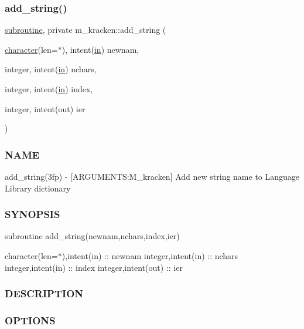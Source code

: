 \subsubsection{\texorpdfstring{add\+\_\+string()}{add\_string()}}
{\footnotesize\ttfamily \hyperlink{M__stopwatch_83_8txt_acfbcff50169d691ff02d4a123ed70482}{subroutine}, private m\+\_\+kracken\+::add\+\_\+string (\begin{DoxyParamCaption}\item[{\hyperlink{option__stopwatch_83_8txt_abd4b21fbbd175834027b5224bfe97e66}{character}(len=$\ast$), intent(\hyperlink{M__journal_83_8txt_afce72651d1eed785a2132bee863b2f38}{in})}]{newnam,  }\item[{integer, intent(\hyperlink{M__journal_83_8txt_afce72651d1eed785a2132bee863b2f38}{in})}]{nchars,  }\item[{integer, intent(\hyperlink{M__journal_83_8txt_afce72651d1eed785a2132bee863b2f38}{in})}]{index,  }\item[{integer, intent(out)}]{ier }\end{DoxyParamCaption})\hspace{0.3cm}{\ttfamily [private]}}



\subsubsection*{N\+A\+ME}

add\+\_\+string(3fp) -\/ \mbox{[}A\+R\+G\+U\+M\+E\+N\+TS\+:M\+\_\+kracken\mbox{]} Add new string name to Language Library dictionary 

\subsubsection*{S\+Y\+N\+O\+P\+S\+IS}

subroutine add\+\_\+string(newnam,nchars,index,ier)

character(len=$\ast$),intent(in) \+:\+: newnam integer,intent(in) \+:\+: nchars integer,intent(in) \+:\+: index integer,intent(out) \+:\+: ier \subsubsection*{D\+E\+S\+C\+R\+I\+P\+T\+I\+ON}

\subsubsection*{O\+P\+T\+I\+O\+NS}

